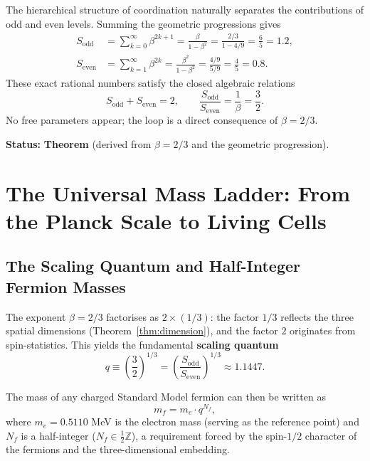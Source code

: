 \documentclass[12pt,a4paper]{article}
\begin{document}
	The hierarchical structure of coordination naturally separates the contributions of odd and even levels. Summing the geometric progressions gives
	\begin{align}
		S_{\mathrm{odd}} &= \sum_{k=0}^{\infty} \beta^{2k+1} = \frac{\beta}{1-\beta^{2}} = \frac{2/3}{1 - 4/9} = \frac{6}{5} = 1.2, \label{eq:sodd}\\
		S_{\mathrm{even}} &= \sum_{k=1}^{\infty} \beta^{2k} = \frac{\beta^{2}}{1-\beta^{2}} = \frac{4/9}{5/9} = \frac{4}{5} = 0.8. \label{eq:seven}
	\end{align}
	These exact rational numbers satisfy the closed algebraic relations
	\begin{equation}
		\boxed{S_{\mathrm{odd}} + S_{\mathrm{even}} = 2, \qquad \frac{S_{\mathrm{odd}}}{S_{\mathrm{even}}} = \frac{1}{\beta} = \frac{3}{2}}.
		\label{eq:algebraic-loop}
	\end{equation}
	No free parameters appear; the loop is a direct consequence of \(\beta = 2/3\).
	
	\textbf{Status:} \textbf{Theorem} (derived from \(\beta = 2/3\) and the geometric progression).
	
	\section{The Universal Mass Ladder: From the Planck Scale to Living Cells}
	\label{sec:mass-ladder}
	
	\subsection{The Scaling Quantum and Half-Integer Fermion Masses}
	
	The exponent \(\beta = 2/3\) factorises as \(2 \times (1/3)\): the factor \(1/3\) reflects the three spatial dimensions (Theorem~\ref{thm:dimension}), and the factor \(2\) originates from spin-statistics. This yields the fundamental \textbf{scaling quantum}
	\begin{equation}
		q \equiv \left(\frac{3}{2}\right)^{1/3} = \left(\frac{S_{\mathrm{odd}}}{S_{\mathrm{even}}}\right)^{1/3} \approx 1.1447.
	\end{equation}
	
	The mass of any charged Standard Model fermion can then be written as
	\begin{equation}
		\boxed{m_f = m_e \cdot q^{N_f}},
		\label{eq:mass-quantization}
	\end{equation}
	where \(m_e = 0.5110\) MeV is the electron mass (serving as the reference point) and \(N_f\) is a half-integer (\(N_f \in \frac{1}{2}\mathbb{Z}\)), a requirement forced by the spin-\(1/2\) character of the fermions and the three-dimensional embedding.
	
\end{document}
